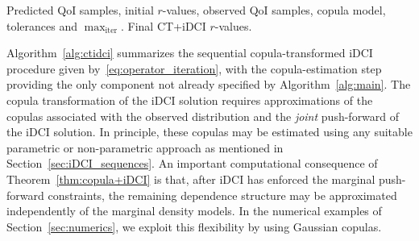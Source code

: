 \documentclass{article}
\newcounter{example}[section]
\begin{document}
\begin{algorithm}
\caption{Copula-Transformed iDCI (CT+iDCI)}
\label{alg:ctidci}
\begin{algorithmic}
    \REQUIRE Predicted QoI samples, initial $r$-values, observed QoI samples,
    copula model, tolerances and $\max_\text{iter}$.
        \ELSE
        \ENDIF
    \ENDFOR
    \ENSURE Final CT+iDCI $r$-values.
\end{algorithmic}
\end{algorithm}

Algorithm~\ref{alg:ctidci} summarizes the sequential copula-transformed iDCI procedure given by~\eqref{eq:operator_iteration}, with the copula-estimation step providing the only component not already specified by Algorithm~\ref{alg:main}.
The copula transformation of the iDCI solution requires approximations of the copulas associated with the observed distribution and the {\em joint} push-forward of the iDCI solution.
In principle, these copulas may be estimated using any suitable parametric or non-parametric approach as mentioned in Section~\ref{sec:iDCI_sequences}.
An important computational consequence of Theorem~\ref{thm:copula+iDCI} is that, after iDCI has enforced the marginal push-forward constraints, the remaining dependence structure may be approximated independently of the marginal density models.
In the numerical examples of Section~\ref{sec:numerics}, we exploit this flexibility by using Gaussian copulas.
\end{document}
